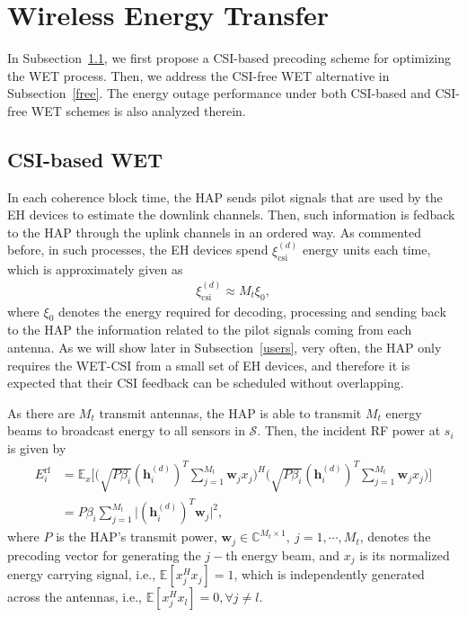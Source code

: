 \documentclass[10pt,journal,a4paper]{IEEEtran}
\begin{document}
	\section{Wireless Energy Transfer}\label{wet}
	In Subsection~\ref{csi}, we first propose a CSI-based precoding scheme for optimizing the WET process. Then, we address the CSI-free WET alternative in Subsection~\ref{free}. The energy outage performance under both CSI-based and CSI-free WET schemes is also analyzed therein.
	\subsection{CSI-based WET}\label{csi}
	In each coherence block time, the HAP sends pilot signals that are used by the EH devices to estimate the downlink channels. Then, such information is fedback  to the HAP through the uplink channels in an ordered way. As commented before, in such processes, the EH devices spend $\xi_\mathrm{csi}^{(d)}$ energy units each time, which is approximately given  as 
	\begin{align}
	\xi_\mathrm{csi}^{(d)}\approx M_t\xi_0,\label{csid}
	\end{align}
	where $\xi_0$ denotes the energy required for decoding, processing and sending back to the HAP the information related to the pilot signals coming from each antenna. As we will show later in Subsection~\ref{users}, very often, the HAP only requires  the WET-CSI from a small set of EH devices, and therefore it is expected that their CSI feedback can be scheduled without overlapping.
	
	As there are $M_t$ transmit antennas, the HAP is able to transmit $M_t$ energy beams to broadcast energy to all sensors in $\mathcal{S}$. Then, the incident RF power at $s_i$ is given by
	\begin{align}\label{Ei}
	E_i^\mathrm{rf}&=\!\mathbb{E}_x\bigg[\!\Big(\!\sqrt{P\beta_i}(\mathbf{h}_i^{\!(d)})^T\!\sum_{j=1}^{M_t}\!\mathbf{w}_jx_j\Big)^{\!\!H}\!\Big(\!\sqrt{P\beta_i}(\mathbf{h}_i^{\!(d)})^T\!\sum_{j=1}^{M_t}\!\mathbf{w}_jx_j\!\Big)\!\bigg]\nonumber\\
	&=\!P\beta_i\sum_{j=1}^{M_t}\!\big|(\mathbf{h}_i^{(d)})^T\mathbf{w}_j\big|^2,
	\end{align}
	where $P$ is the HAP's transmit power, $\mathbf{w}_j\in\mathbb{C}^{M_t\times 1},\  j=1,\cdots,M_t$, denotes the precoding vector for generating the $j-$th energy beam, and $x_j$ is its normalized energy carrying signal, i.e., $\mathbb{E}[x_j^Hx_j]=1$, which is independently generated across the antennas, i.e., $\mathbb{E}[x_j^Hx_l]=0, \forall j\ne l$. 
\end{document}
